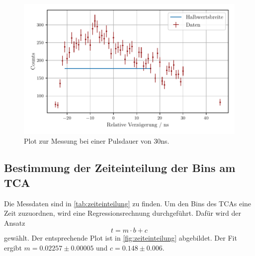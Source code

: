 \begin{figure}
    \centering
    \includegraphics[width = 0.7 \linewidth]{build/30ns_plot.pdf}
    \caption{Plot zur Messung bei einer Pulsdauer von $30$ns.}
    \label{fig:30ns_plot}
\end{figure}

\subsection{Bestimmung der Zeiteinteilung der Bins am TCA} \label{sec:zeiteinteilung}

Die Messdaten sind in \autoref{tab:zeiteinteilung} zu finden.
Um den Bins des TCAs eine Zeit zuzuordnen, wird eine Regressionsrechnung durchgeführt.
Dafür wird der Ansatz
\begin{equation*}
    t = m \cdot b + c
\end{equation*}
gewählt.
Der entsprechende Plot ist in \autoref{fig:zeiteinteilung} abgebildet.
Der Fit ergibt $m = 0.02257 \pm 0.00005$ und $c = 0.148 \pm 0.006$.


